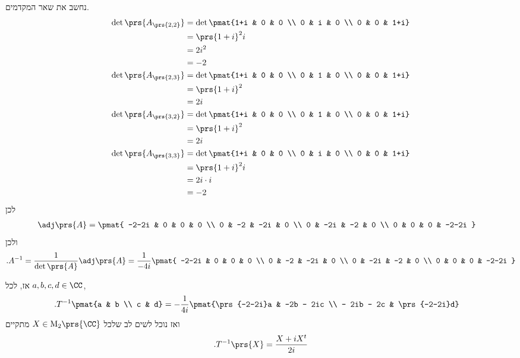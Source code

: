 \documentclass[a4paper,10pt,twoside,openany]{book}
\renewcommand{\Mat}{\mathrm{M}}
\begin{document}
\begin{solution}
נחשב את שאר המקדמים.
\begin{align*}
\det\prs{A_{\prs{2,2}}} &= \det\pmat{1+i & 0 & 0 \\ 0 & i & 0 \\ 0 & 0 & 1+i}
\\&= \prs{1+i}^2 i \\&= 2i^2 \\&= -2 \\
\det\prs{A_{\prs{2,3}}} &= \det\pmat{1+i & 0 & 0 \\ 0 & 1 & 0 \\ 0 & 0 & 1+i}
\\&=
\prs{1+i}^2 \\&= 2i \\
\det\prs{A_{\prs{3,2}}} &= \det\pmat{1+i & 0 & 0 \\ 0 & 1 & 0 \\ 0 & 0 & 1+i}
\\&= \prs{1+i}^2
\\&= 2i \\
\det\prs{A_{\prs{3,3}}} &= \det\pmat{1+i & 0 & 0 \\ 0 & i & 0 \\ 0 & 0 & 1+i}
\\&=
\prs{1+i}^2 i
\\&= 2i \cdot i
\\&= -2
\end{align*}
לכן
\begin{align*}
\adj\prs{A} &= \pmat{
	-2-2i & 0 & 0 & 0 \\
	0 & -2 & -2i & 0 \\
	0 & -2i & -2 & 0 \\
	0 & 0 & 0 & -2-2i
}
\end{align*}
ולכן
\[\text{.} A^{-1} = \frac{1}{\det\prs{A}} \adj\prs{A} = \frac{1}{-4i} \pmat{
	-2-2i & 0 & 0 & 0 \\
	0 & -2 & -2i & 0 \\
	0 & -2i & -2 & 0 \\
	0 & 0 & 0 & -2-2i
}\]

אז, לכל
$a,b,c,d \in \CC$,
\begin{align*}
\text{.} T^{-1}\pmat{a & b \\ c & d} &= - \frac{1}{4i} \pmat{\prs{-2-2i}a & -2b - 2ic \\ - 2ib - 2c & \prs{-2-2i}d}
\end{align*}
ואז נוכל לשים לב שלכל
$X \in \Mat_2\prs{\CC}$
מתקיים
\[\text{.} T^{-1}\prs{X} = \frac{X + iX^t}{2i}\]
\end{solution}
\end{document}
